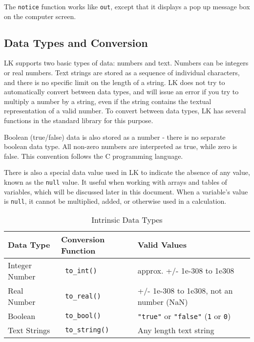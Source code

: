 \documentclass{article}
\begin{document}
The \texttt{notice} function works like \texttt{out}, except that it displays a pop up message box on the computer screen.

\subsection{Data Types and Conversion}

LK supports two basic types of data: numbers and text.  Numbers can be integers or real numbers.  Text strings are stored as a sequence of individual characters, and there is no specific limit on the length of a string.  LK does not try to automatically convert between data types, and will issue an error if you try to multiply a number by a string, even if the string contains the textual representation of a valid number.   To convert between data types, LK has several functions in the standard library for this purpose.

Boolean (true/false) data is also stored as a number - there is no separate boolean data type.  All non-zero numbers are interpreted as true, while zero is false.  This convention follows the C programming language.

There is also a special data value used in LK to indicate the absence of any value, known as the \texttt{null} value.  It useful when working with arrays and tables of variables, which will be discussed later in this document.  When a variable's value is \texttt{null}, it cannot be multiplied, added, or otherwise used in a calculation.


\begin{table}[ht]
\begin{center}
\begin{tabular}{lll}
Data Type & Conversion Function & Valid Values \\
\hline
Integer Number & \texttt{ to\_int() } & approx. +/- 1e-308 to 1e308 \\
Real Number & \texttt{ to\_real() } & +/- 1e-308 to 1e308, not an number (NaN) \\
Boolean & \texttt{ to\_bool() } & \texttt{"true"} or \texttt{"false"} (\texttt{1} or \texttt{0}) \\
Text Strings & \texttt{ to\_string() } & Any length text string \\
\end{tabular}
\caption{Intrinsic Data Types}
\label{tab_datatypes}
\end{center}
\end{table}
\end{document}
